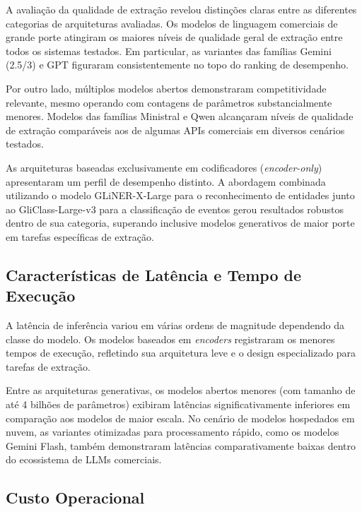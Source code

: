 \documentclass{IEEEphot}
\begin{document}
A avaliação da qualidade de extração revelou distinções claras entre as diferentes categorias de arquiteturas avaliadas. Os modelos de linguagem comerciais de grande porte atingiram os maiores níveis de qualidade geral de extração entre todos os sistemas testados. Em particular, as variantes das famílias Gemini (2.5/3) e GPT figuraram consistentemente no topo do ranking de desempenho.

Por outro lado, múltiplos modelos abertos demonstraram competitividade relevante, mesmo operando com contagens de parâmetros substancialmente menores. Modelos das famílias Ministral e Qwen alcançaram níveis de qualidade de extração comparáveis aos de algumas APIs comerciais em diversos cenários testados. 

As arquiteturas baseadas exclusivamente em codificadores (\textit{encoder-only}) apresentaram um perfil de desempenho distinto. A abordagem combinada utilizando o modelo GLiNER-X-Large para o reconhecimento de entidades junto ao GliClass-Large-v3 para a classificação de eventos gerou resultados robustos dentro de sua categoria, superando inclusive modelos generativos de maior porte em tarefas específicas de extração.


\subsection{Características de Latência e Tempo de Execução}

A latência de inferência variou em várias ordens de magnitude dependendo da classe do modelo. Os modelos baseados em \textit{encoders} registraram os menores tempos de execução, refletindo sua arquitetura leve e o design especializado para tarefas de extração. 

Entre as arquiteturas generativas, os modelos abertos menores (com tamanho de até 4 bilhões de parâmetros) exibiram latências significativamente inferiores em comparação aos modelos de maior escala. No cenário de modelos hospedados em nuvem, as variantes otimizadas para processamento rápido, como os modelos Gemini Flash, também demonstraram latências comparativamente baixas dentro do ecossistema de LLMs comerciais.

\subsection{Custo Operacional}
\end{document}
